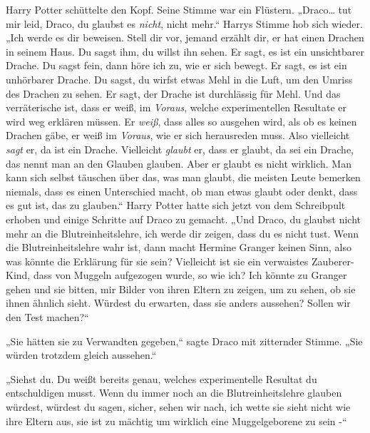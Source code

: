 Harry Potter schüttelte den Kopf. Seine Stimme war ein Flüstern. „Draco… tut mir leid, Draco, du glaubst es \emph{nicht}, nicht mehr.“ Harrys Stimme hob sich wieder. „Ich werde es dir beweisen. Stell dir vor, jemand erzählt dir, er hat einen Drachen in seinem Haus. Du sagst ihm, du willst ihn sehen. Er sagt, es ist ein unsichtbarer Drache. Du sagst fein, dann höre ich zu, wie er sich bewegt. Er sagt, es ist ein unhörbarer Drache. Du sagst, du wirfst etwas Mehl in die Luft, um den Umriss des Drachen zu sehen. Er sagt, der Drache ist durchlässig für Mehl. Und das verräterische ist, dass er weiß, im \emph{Voraus}, welche experimentellen Resultate er wird weg erklären müssen. Er \emph{weiß}, dass alles so ausgehen wird, als ob es keinen Drachen gäbe, er weiß im \emph{Voraus}, wie er sich herausreden muss. Also vielleicht \emph{sagt} er, da ist ein Drache. Vielleicht \emph{glaubt} er, dass er glaubt, da sei ein Drache, das nennt man an den Glauben glauben. Aber er glaubt es nicht wirklich. Man kann sich selbst täuschen über das, was man glaubt, die meisten Leute bemerken niemals, dass es einen Unterschied macht, ob man etwas glaubt oder denkt, dass es gut ist, das zu glauben.“ Harry Potter hatte sich jetzt von dem Schreibpult erhoben und einige Schritte auf Draco zu gemacht. „Und Draco, du glaubst nicht mehr an die Blutreinheitslehre, ich werde dir zeigen, dass du es nicht tust. Wenn die Blutreinheitslehre wahr ist, dann macht Hermine Granger keinen Sinn, also was könnte die Erklärung für sie sein? Vielleicht ist sie ein verwaistes Zauberer-Kind, dass von Muggeln aufgezogen wurde, so wie ich? Ich könnte zu Granger gehen und sie bitten, mir Bilder von ihren Eltern zu zeigen, um zu sehen, ob sie ihnen ähnlich sieht. Würdest du erwarten, dass sie anders aussehen? Sollen wir den Test machen?“

„Sie hätten sie zu Verwandten gegeben,“ sagte Draco mit zitternder Stimme. „Sie würden trotzdem gleich aussehen.“

„Siehst du. Du weißt bereits genau, welches experimentelle Resultat du entschuldigen musst. Wenn du immer noch an die Blutreinheitslehre glauben würdest, würdest du sagen, sicher, sehen wir nach, ich wette sie sieht nicht wie ihre Eltern aus, sie ist zu mächtig um wirklich eine Muggelgeborene zu sein -“

